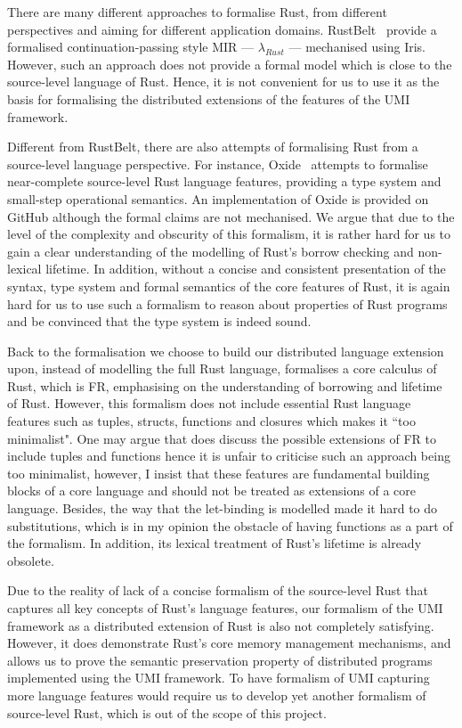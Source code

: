 There are many different approaches to formalise Rust, from different perspectives and aiming for different application domains. RustBelt~\citep{10.1145/3158154} provide a formalised continuation-passing style MIR --- $\lambda_{\textit{Rust}}$ --- mechanised using Iris. However, such an approach does not provide a formal model which is close to the source-level language of Rust. Hence, it is not convenient for us to use it as the basis for formalising the distributed extensions of the features of the UMI framework.

Different from RustBelt, there are also attempts of formalising Rust from a source-level language perspective. For instance, Oxide~\citep{weiss2021oxide} attempts to formalise near-complete source-level Rust language features, providing a type system and small-step operational semantics. An implementation of Oxide is provided on GitHub although the formal claims are not mechanised. We argue that due to the level of the complexity and obscurity of this formalism, it is rather hard for us to gain a clear understanding of the modelling of Rust's borrow checking and non-lexical lifetime. In addition, without a concise and consistent presentation of the syntax, type system and formal semantics of the core features of Rust, it is again hard for us to use such a formalism to reason about properties of Rust programs and be convinced that the type system is indeed sound.

Back to the formalisation we choose to build our distributed language extension upon, instead of modelling the full Rust language, \citet{10.1145/3443420} formalises a core calculus of Rust, which is FR, emphasising on the understanding of borrowing and lifetime of Rust. However, this formalism does not include essential Rust language features such as tuples, structs, functions and closures which makes it ``too minimalist". One may argue that \citet{10.1145/3443420} does discuss the possible extensions of FR to include tuples and functions hence it is unfair to criticise such an approach being too minimalist, however, I insist that these features are fundamental building blocks of a core language and should not be treated as extensions of a core language. Besides, the way that the let-binding is modelled made it hard to do substitutions, which is in my opinion the obstacle of having functions as a part of the formalism. In addition, its lexical treatment of Rust's lifetime is already obsolete.

Due to the reality of lack of a concise formalism of the source-level Rust that captures all key concepts of Rust's language features, our formalism of the UMI framework as a distributed extension of Rust is also not completely satisfying. However, it does demonstrate Rust's core memory management mechanisms, and allows us to prove the semantic preservation property of distributed programs implemented using the UMI framework. To have formalism of UMI capturing more language features would require us to develop yet another formalism of source-level Rust, which is out of the scope of this project.

